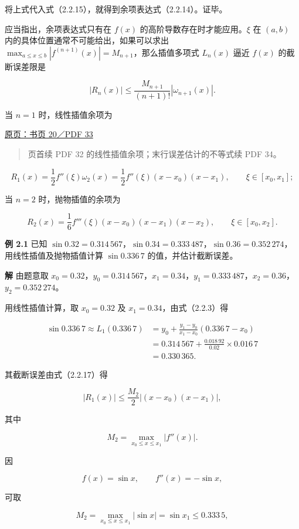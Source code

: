 \documentclass[
  10pt,
  fontset=fandol]{ctexart}
\begin{document}
将上式代入式（2.2.15），就得到余项表达式（2.2.14）。证毕。

应当指出，余项表达式只有在 \(f(x)\) 的高阶导数存在时才能应用。\(\xi\) 在 \((a,b)\) 内的具体位置通常不可能给出，如果可以求出 \(\max_{a\le x\le b}|f^{(n+1)}(x)|=M_{n+1}\)，那么插值多项式 \(L_n(x)\) 逼近 \(f(x)\) 的截断误差限是

\[
|R_n(x)|\le\frac{M_{n+1}}{(n+1)!}|\omega_{n+1}(x)|.
\tag{2.2.16}
\]

当 \(n=1\) 时，线性插值余项为

\href{../../source-images/pdf-033.jpeg}{原页：书页 20／PDF 33}

\begin{quote}
页首续 PDF 32 的线性插值余项；末行误差估计的不等式续 PDF 34。
\end{quote}

\[
R_1(x)=\frac12 f''(\xi)\omega_2(x)
=\frac12 f''(\xi)(x-x_0)(x-x_1),
\qquad \xi\in[x_0,x_1];
\tag{2.2.17}
\]

当 \(n=2\) 时，抛物插值的余项为

\[
R_2(x)=\frac16 f'''(\xi)(x-x_0)(x-x_1)(x-x_2),
\qquad \xi\in[x_0,x_2].
\tag{2.2.18}
\]

\textbf{例 2.1} 已知 \(\sin0.32=0.314\,567\)，\(\sin0.34=0.333\,487\)，\(\sin0.36=0.352\,274\)，用线性插值及抛物插值计算 \(\sin0.336\,7\) 的值，并估计截断误差。

\textbf{解} 由题意取 \(x_0=0.32\)，\(y_0=0.314\,567\)，\(x_1=0.34\)，\(y_1=0.333\,487\)，\(x_2=0.36\)，\(y_2=0.352\,274\)。

用线性插值计算，取 \(x_0=0.32\) 及 \(x_1=0.34\)，由式（2.2.3）得

\[
\begin{aligned}
\sin0.336\,7\approx L_1(0.336\,7)
&=y_0+\frac{y_1-y_0}{x_1-x_0}(0.336\,7-x_0)\\
&=0.314\,567+\frac{0.018\,92}{0.02}\times0.016\,7\\
&=0.330\,365.
\end{aligned}
\]

其截断误差由式（2.2.17）得

\[
|R_1(x)|\le\frac{M_2}{2}|(x-x_0)(x-x_1)|,
\]

其中

\[
M_2=\max_{x_0\le x\le x_1}|f''(x)|.
\]

因

\[
f(x)=\sin x,\qquad f''(x)=-\sin x,
\]

可取

\[
M_2=\max_{x_0\le x\le x_1}|\sin x|=\sin x_1\le0.333\,5,
\]
\end{document}
